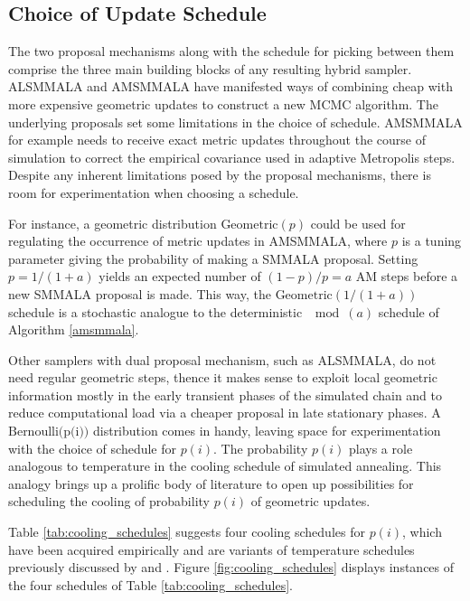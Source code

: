 \documentclass[twoside,11pt]{article}
\begin{document}
{\subsection{Choice of Update Schedule}

The two proposal mechanisms along with the schedule for picking between them comprise the three main building blocks of any
resulting hybrid sampler. ALSMMALA and AMSMMALA have manifested ways of combining cheap with more expensive geometric updates
to construct a new MCMC algorithm. The underlying proposals set some limitations in the choice of schedule. AMSMMALA for
example needs to receive exact metric updates throughout the course of simulation to correct the empirical covariance used in
adaptive Metropolis steps. Despite any inherent limitations posed by the proposal mechanisms, there is room for 
experimentation when choosing a schedule.

For instance, a geometric distribution $\mbox{Geometric}(p)$ could be used for regulating the occurrence of metric updates 
in AMSMMALA, where $p$ is a tuning parameter giving the probability of making a SMMALA proposal. Setting $p=1/(1+a)$ yields 
an expected number of $(1-p)/p=a$ AM steps before a new SMMALA proposal is made. This way, the $\mbox{Geometric}(1/(1+a))$ 
schedule is a stochastic analogue to the deterministic $\mod{(a)}$ schedule of Algorithm \ref{amsmmala}.

Other samplers with dual proposal mechanism, such as ALSMMALA, do not need regular geometric steps, thence it makes sense to 
exploit local geometric information mostly in the early transient phases of the simulated chain and to reduce computational 
load via a cheaper proposal in late stationary phases. A $\mbox{Bernoulli(p(i))}$ distribution comes in handy, leaving space 
for experimentation with the choice of schedule for $p(i)$. The probability $p(i)$ plays a role analogous to temperature in 
the cooling schedule of simulated annealing. This analogy brings up a prolific body of literature to open up possibilities 
for scheduling the cooling of probability $p(i)$ of geometric updates.

Table \ref{tab:cooling_schedules} suggests four cooling schedules for $p(i)$, which have been acquired empirically and are 
variants of temperature schedules previously discussed by \cite{haj__coo} and \cite{nou_and__aco}.
Figure \ref{fig:cooling_schedules} displays instances of the four schedules of Table \ref{tab:cooling_schedules}.

}
\end{document}
